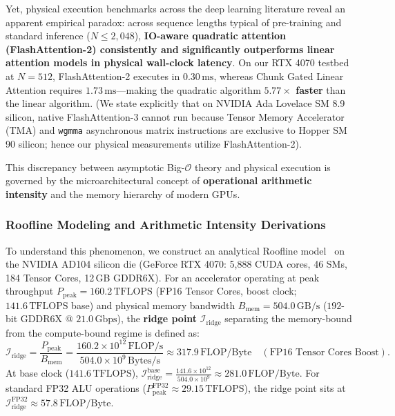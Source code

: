 Yet, physical execution benchmarks across the deep learning literature reveal an apparent empirical paradox: across sequence lengths typical of pre-training and standard inference ($N \le 2{,}048$), \textbf{IO-aware quadratic attention (FlashAttention-2) consistently and significantly outperforms linear attention models in physical wall-clock latency}. On our RTX 4070 testbed at $N=512$, FlashAttention-2 executes in $0.30\,\text{ms}$, whereas Chunk Gated Linear Attention requires $1.73\,\text{ms}$---making the quadratic algorithm \textbf{$5.77\times$ faster} than the linear algorithm. (We state explicitly that on NVIDIA Ada Lovelace SM 8.9 silicon, native FlashAttention-3 cannot run because Tensor Memory Accelerator (TMA) and \texttt{wgmma} asynchronous matrix instructions are exclusive to Hopper SM 90 silicon; hence our physical measurements utilize FlashAttention-2).

This discrepancy between asymptotic Big-$\mathcal{O}$ theory and physical execution is governed by the microarchitectural concept of \textbf{operational arithmetic intensity} and the memory hierarchy of modern GPUs.

\subsubsection{Roofline Modeling and Arithmetic Intensity Derivations}
\label{sec:results_roofline_derivation}

To understand this phenomenon, we construct an analytical Roofline model~\cite{williams2009roofline} on the NVIDIA AD104 silicon die (GeForce RTX 4070: 5,888 CUDA cores, 46 SMs, 184 Tensor Cores, 12\,GB GDDR6X). For an accelerator operating at peak throughput $P_{\text{peak}} = 160.2\,\text{TFLOPS}$ (FP16 Tensor Cores, boost clock; $141.6\,\text{TFLOPS}$ base) and physical memory bandwidth $B_{\text{mem}} = 504.0\,\text{GB/s}$ ($192$-bit GDDR6X @ $21.0\,\text{Gbps}$), the \textbf{ridge point} $\mathcal{I}_{\text{ridge}}$ separating the memory-bound from the compute-bound regime is defined as:
\begin{equation}
\label{eq:roofline_ridge_exact}
\mathcal{I}_{\text{ridge}} = \frac{P_{\text{peak}}}{B_{\text{mem}}} = \frac{160.2 \times 10^{12}\,\text{FLOP/s}}{504.0 \times 10^9\,\text{Bytes/s}} \approx 317.9\,\text{FLOP/Byte}\quad(\text{FP16 Tensor Cores Boost}).
\end{equation}
At base clock ($141.6\,\text{TFLOPS}$), $\mathcal{I}_{\text{ridge}}^{\text{base}} = \frac{141.6 \times 10^{12}}{504.0 \times 10^9} \approx 281.0\,\text{FLOP/Byte}$. For standard FP32 ALU operations ($P_{\text{peak}}^{\text{FP32}} \approx 29.15\,\text{TFLOPS}$), the ridge point sits at $\mathcal{I}_{\text{ridge}}^{\text{FP32}} \approx 57.8\,\text{FLOP/Byte}$.

